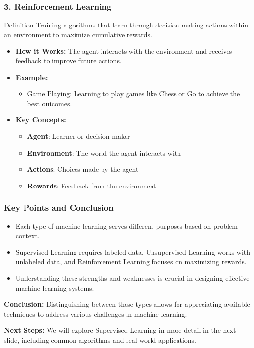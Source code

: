 \documentclass[aspectratio=169]{beamer}
\begin{document}
\begin{frame}[fragile]
    \frametitle{3. Reinforcement Learning}
    \begin{block}{Definition}
        Training algorithms that learn through decision-making actions within an environment to maximize cumulative rewards.
    \end{block}
    
    \begin{itemize}
        \item \textbf{How it Works:} The agent interacts with the environment and receives feedback to improve future actions.
        \item \textbf{Example:}
        \begin{itemize}
            \item Game Playing: Learning to play games like Chess or Go to achieve the best outcomes.
        \end{itemize}
        \item \textbf{Key Concepts:}
        \begin{itemize}
            \item \textbf{Agent}: Learner or decision-maker
            \item \textbf{Environment}: The world the agent interacts with
            \item \textbf{Actions}: Choices made by the agent
            \item \textbf{Rewards}: Feedback from the environment
        \end{itemize}
    \end{itemize}
\end{frame}

\begin{frame}[fragile]
    \frametitle{Key Points and Conclusion}
    \begin{itemize}
        \item Each type of machine learning serves different purposes based on problem context.
        \item Supervised Learning requires labeled data, Unsupervised Learning works with unlabeled data, and Reinforcement Learning focuses on maximizing rewards.
        \item Understanding these strengths and weaknesses is crucial in designing effective machine learning systems.
    \end{itemize}
    
    \textbf{Conclusion:} Distinguishing between these types allows for appreciating available techniques to address various challenges in machine learning.
    
    \textbf{Next Steps:} We will explore Supervised Learning in more detail in the next slide, including common algorithms and real-world applications.
\end{frame}
\end{document}
